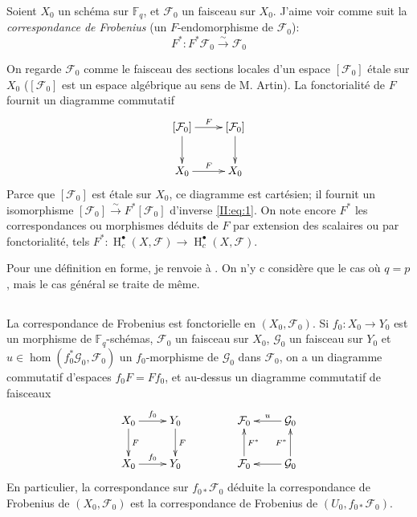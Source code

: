 \documentclass{book}
\DeclareMathOperator{\h}{H}
\newcommand{\cF}{\mathcal{F}}
\newcommand{\cG}{\mathcal{G}}
\newcommand{\dF}{\mathbb{F}}
\newcommand{\iso}{\xrightarrow\sim}
\begin{document}
Soient $X_0$ un schéma sur $\dF_q$, et $\cF_0$ un faisceau sur $X_0$. J'aime 
voir comme suit la \emph{correspondance de Frobenius} (un $F$-endomorphisme de 
$\cF_0$): 
\begin{equation}\label{II:eq:1}
  F^* : F^*\cF_0 \iso \cF_0
\end{equation}

On regarde $\cF_0$ comme le faisceau des sections locales d'un espace 
$[\cF_0]$ étale sur $X_0$ ($[\cF_0]$ est un espace algébrique au sens de M. 
Artin). La fonctorialité de $F$ fournit un diagramme commutatif 
\[\xymatrix{
  [\cF_0] \ar[r]^-F \ar[d]
    & [\cF_0] \ar[d] \\
  X_0 \ar[r]^F 
    & X_0
}\]
Parce que $[\cF_0]$ est étale sur $X_0$, ce diagramme est cartésien; il fournit 
un isomorphisme $[\cF_0]\iso F^*[\cF_0]$ d'inverse \eqref{II:eq:1}. On note 
encore $F^*$ les correspondances ou morphismes déduits de $F$ par extension 
des scalaires ou par fonctorialité, tels 
$F^*:\h_c^\bullet(X,\cF)\to \h_c^\bullet(X,\cF)$. 

Pour une définition en forme, je renvoie à \cite[XI.1,2]{SGA5}. On n'y c
considère que le cas où $q=p$, mais le cas général se traite de même. 





\subsection{}\label{II:1-3}

La correspondance de Frobenius est fonctorielle en $(X_0,\cF_0)$. Si 
$f_0:X_0\to Y_0$ est un morphisme de $\dF_q$-schémas, $\cF_0$ un faisceau sur 
$X_0$, $\cG_0$ un faisceau sur $Y_0$ et $u\in\hom(f_0^*\cG_0,\cF_0)$ un 
$f_0$-morphisme de $\cG_0$ dans $\cF_0$, on a un diagramme commutatif d'espaces 
$f_0 F = F f_0$, et au-dessus un diagramme commutatif de faisceaux 
\[\xymatrix{
  X_0 \ar[r]^-{f_0} \ar[d]^-F
    & Y_0 \ar[d]^-F \\
  X_0 \ar[r]^-{f_0} 
    & Y_0
}\qquad\qquad
\xymatrix{
  \cF_0 
    & \ar[l]_-u \cG_0 \\
  \cF_0 \ar[u]_-{F^*} 
    & \ar[l] \cG_0 \ar[u]^-{F^*}
}\]
En particulier, la correspondance sur $f_{0*}\cF_0$ déduite la correspondance 
de Frobenius de $(X_0,\cF_0)$ est la correspondance de Frobenius de 
$(U_0,f_{0*}\cF_0)$. 





\subsection{}\label{II:1-4}
\end{document}
